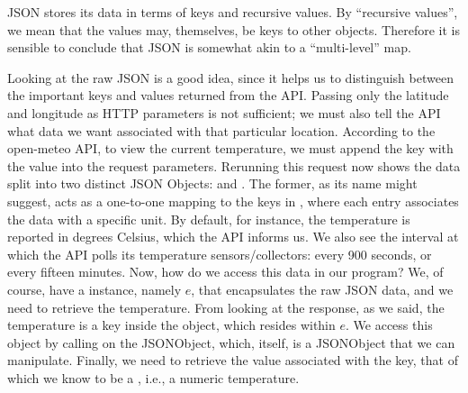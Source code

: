 JSON stores its data in terms of keys and recursive values. By ``recursive values'', we mean that the values may, themselves, be keys to other objects. Therefore it is sensible to conclude that JSON is somewhat akin to a ``multi-level'' map. 

Looking at the raw JSON is a good idea, since it helps us to distinguish between the important keys and values returned from the API. Passing only the latitude and longitude as HTTP parameters is not sufficient; we must also tell the API what data we want associated with that particular location. According to the open-meteo API, to view the current temperature, we must append the  key with the  value into the request parameters. Rerunning this request now shows the data split into two distinct JSON Objects:  and . The former, as its name might suggest, acts as a one-to-one mapping to the keys in , where each entry associates the data with a specific unit. By default, for instance, the temperature is reported in degrees Celsius, which the API informs us. We also see the interval at which the API polls its temperature sensors/collectors: every 900 seconds, or every fifteen minutes. Now, how do we access this data in our program? We, of course, have a  instance, namely $e$, that encapsulates the raw JSON data, and we need to retrieve the temperature. From looking at the response, as we said, the temperature is a key inside the  object, which resides within $e$. We access this object by calling  on the JSONObject, which, itself, is a JSONObject that we can manipulate. Finally, we need to retrieve the value associated with the  key, that of which we know to be a , i.e., a numeric temperature.

